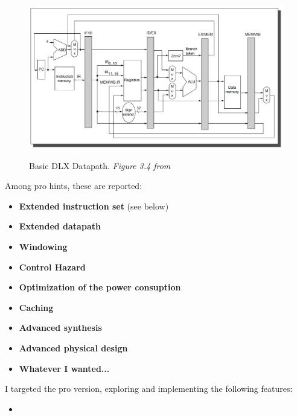 \begin{figure}[H]
\centering
\includegraphics[scale=.7]{Immagini/00}
\label{00}
\caption{Basic DLX Datapath. \textit{Figure 3.4 from \cite{book:rif.1}}}
\end{figure}

Among pro hints, these are reported:
\begin{itemize}
\item \textbf{Extended instruction set} (see below)
\item \textbf{Extended datapath}
\item \textbf{Windowing}
\item \textbf{Control Hazard}
\item \textbf{Optimization of the power consuption}
\item \textbf{Caching}
\item \textbf{Advanced synthesis}
\item \textbf{Advanced physical design}
\item \textbf{Whatever I wanted...}
\end{itemize}

I targeted the pro version, exploring and implementing the following features:
\begin{itemize}
\item 
\end{itemize}